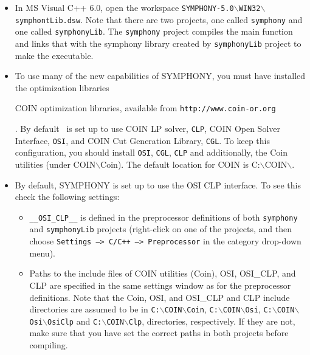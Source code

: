 \begin{itemize}

\item In MS Visual C++ 6.0, open the workspace
\texttt{SYMPHONY-5.0$\backslash$WIN32$\backslash$symphontLib.dsw}. 
Note that there are two projects, one called \texttt{symphony} and one called
\texttt{symphonyLib}. The \texttt{symphony} project compiles the main function 
and links that with the symphony library created by \texttt{symphonyLib} 
project to make the executable.

\item To use many of the new capabilities of SYMPHONY, you must have installed
the  optimization
libraries 
\begin{latexonly} 
COIN optimization libraries, available from
\texttt{http://www.coin-or.org} 
\end{latexonly}. By default \BB\ is 
set up to use COIN LP solver, \texttt{CLP}, COIN Open Solver Interface, 
\texttt{OSI}, and COIN Cut Generation Library, \texttt{CGL}. To keep this 
configuration, you should install \texttt{OSI}, \texttt{CGL}, \texttt{CLP} 
and additionally, the Coin utilities (under COIN$\backslash$Coin).
The default location for COIN is C:$\backslash$COIN$\backslash$.

\item By default, SYMPHONY is set up to use the OSI CLP interface. To see this
check the following settings:

\begin{itemize}

\item \texttt{\_\_OSI\_CLP\_\_} is defined in the preprocessor
definitions of both \texttt{symphony} and \texttt{symphonyLib} projects 
(right-click on one of the projects, and then choose \texttt{Settings --> C/C++
--> Preprocessor} in the category drop-down menu).

\item Paths to the include files of COIN utilities (Coin), OSI, OSI\_CLP, and
CLP are specified in the same settings window as for the preprocessor
definitions. Note that the Coin, OSI, and OSI\_CLP and CLP include 
directories are assumed to be in \texttt{C:$\backslash$COIN$\backslash$Coin},
\texttt{C:$\backslash$COIN$\backslash$Osi},
\texttt{C:$\backslash$COIN$\backslash$Osi$\backslash$OsiClp} and 
\texttt{C:$\backslash$COIN$\backslash$Clp},
directories, respectively. If they are not, make sure that you have set the
correct paths in both projects before compiling.


\end{itemize}
\end{itemize}
